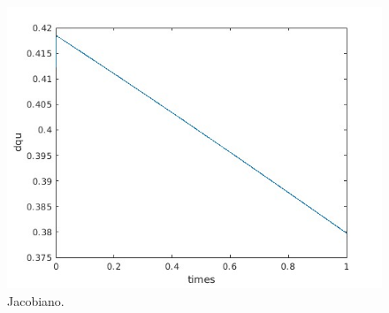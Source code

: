 \documentclass{article}
\begin{document}
\begin{figure}[htbp]
\centering
\includegraphics[width=\linewidth]{dqu}
\caption{Jacobiano.} \label{fig:dqu}
\end{figure}
\end{document}
